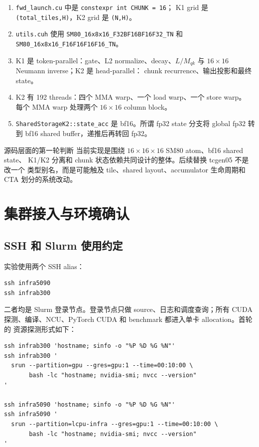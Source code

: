 \documentclass[11pt,a4paper,fontset=none]{ctexart}
\newcommand{\code}[1]{\texttt{#1}}
\begin{document}
\begin{enumerate}
  \item \code{fwd\_launch.cu} 中是 \code{constexpr int CHUNK = 16}；
        K1 grid 是 \code{(total\_tiles,H)}，K2 grid 是 \code{(N,H)}。
  \item \code{utils.cuh} 使用
        \code{SM80\_16x8x16\_F32BF16BF16F32\_TN} 和
        \code{SM80\_16x8x16\_F16F16F16F16\_TN}。
  \item K1 是 token-parallel：gate、L2 normalize、decay、\(L/M_{qk}\)
        与 \(16\times16\) Neumann inverse；K2 是 head-parallel：
        chunk recurrence、输出投影和最终 state。
  \item K2 有 192 threads：四个 MMA warp、一个 load warp、一个 store warp。
        每个 MMA warp 处理两个 \(16\times16\) column block。
  \item \code{SharedStorageK2::state\_acc} 是 bf16。所谓 fp32 state
        分支将 global fp32 转到 bf16 shared buffer，递推后再转回 fp32。
\end{enumerate}

\begin{decision}{源码层面的第一轮判断}
当前实现是围绕 \(16\times16\times16\) SM80 atom、bf16 shared state、
K1/K2 分离和 chunk 状态依赖共同设计的整体。后续替换 tcgen05 不是改一个
类型别名，而是可能触及 tile、shared layout、accumulator 生命周期和 CTA
划分的系统改动。
\end{decision}

\section{集群接入与环境确认}

\subsection{SSH 和 Slurm 使用约定}

实验使用两个 SSH alias：

\begin{lstlisting}
ssh infra5090
ssh infrab300
\end{lstlisting}

二者均是 Slurm 登录节点。登录节点只做 source、日志和调度查询；所有 CUDA
探测、编译、NCU、PyTorch CUDA 和 benchmark 都进入单卡 allocation。首轮的
资源探测形式如下：

\begin{lstlisting}
ssh infrab300 'hostname; sinfo -o "%P %D %G %N"'
ssh infrab300 '
  srun --partition=gpu --gres=gpu:1 --time=00:10:00 \
       bash -lc "hostname; nvidia-smi; nvcc --version"
'

ssh infra5090 'hostname; sinfo -o "%P %D %G %N"'
ssh infra5090 '
  srun --partition=lcpu-infra --gres=gpu:1 --time=00:10:00 \
       bash -lc "hostname; nvidia-smi; nvcc --version"
'
\end{lstlisting}
\end{document}

